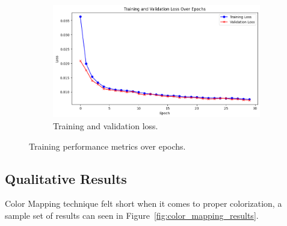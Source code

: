 \documentclass[conference]{IEEEtran}
\begin{document}
\begin{figure}[t]
\begin{subfigure}{\columnwidth}
        \label{fig:loss_r2}
    \end{subfigure}
    \hfill
    \begin{subfigure}{\columnwidth}
        \centering
        \includegraphics[width=\linewidth]{8_training_loss_validation_loss.png}
        \caption{Training and validation loss.}
        \label{fig:train_val_loss}
    \end{subfigure}
    
    \caption{Training performance metrics over epochs.}
    \label{fig:training_metrics}
\end{figure}


\subsection{Qualitative Results}
Color Mapping technique felt short when it comes to proper colorization, a sample set of results can seen in Figure~\ref{fig:color_mapping_results}.
\end{document}
